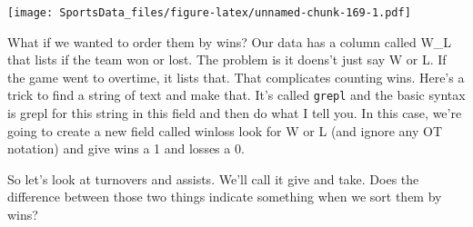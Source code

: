 \documentclass[]{book}
\newenvironment{Shaded}{\begin{snugshade}}{\end{snugshade}}
\newcommand{\KeywordTok}[1]{\textcolor[rgb]{0.13,0.29,0.53}{\textbf{#1}}}
\newcommand{\DataTypeTok}[1]{\textcolor[rgb]{0.13,0.29,0.53}{#1}}
\newcommand{\DecValTok}[1]{\textcolor[rgb]{0.00,0.00,0.81}{#1}}
\newcommand{\StringTok}[1]{\textcolor[rgb]{0.31,0.60,0.02}{#1}}
\newcommand{\OperatorTok}[1]{\textcolor[rgb]{0.81,0.36,0.00}{\textbf{#1}}}
\newcommand{\NormalTok}[1]{#1}
\begin{document}
\texttt{[image: SportsData\_files/figure-latex/unnamed-chunk-169-1.pdf]}

What if we wanted to order them by wins? Our data has a column called
W\_L that lists if the team won or lost. The problem is it doens't just
say W or L. If the game went to overtime, it lists that. That
complicates counting wins. Here's a trick to find a string of text and
make that. It's called \texttt{grepl} and the basic syntax is grepl for
this string in this field and then do what I tell you. In this case,
we're going to create a new field called winloss look for W or L (and
ignore any OT notation) and give wins a 1 and losses a 0.

\begin{Shaded}
\end{Shaded}

So let's look at turnovers and assists. We'll call it give and take.
Does the difference between those two things indicate something when we
sort them by wins?

\begin{Shaded}
\end{Shaded}

\begin{Shaded}
\end{Shaded}
\end{document}
